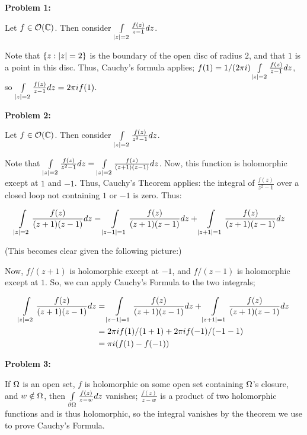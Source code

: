 \documentclass[a4paper,12pt]{article}
\begin{document}
{\bf Problem 1:}

Let $f \in \mathcal{O}(\mathbb{C})$. Then consider $\int\limits_{\left\lvert z \right\rvert = 2} \frac{f(z)}{z-1} dz$.

Note that $\{z: \left\lvert z \right\rvert=2\}$ is the boundary of the open disc of radius $2$, and that $1$ is a point in this disc. Thus, Cauchy's formula applies; $f(1) = 1/(2\pi i)  \int\limits_{\left\lvert z \right\rvert = 2} \frac{f(z)}{z-1} dz$, so $\int\limits_{\left\lvert z \right\rvert = 2} \frac{f(z)}{z-1} dz = 2 \pi i f(1)$.

\shunt

{\bf Problem 2:}

Let $f \in \mathcal{O}(\mathbb{C})$. Then consider $\int\limits_{\left\lvert z \right\rvert = 2} \frac{f(z)}{z^2-1} dz$.

Note that $\int\limits_{\left\lvert z \right\rvert = 2} \frac{f(z)}{z^2-1} dz = \int\limits_{\left\lvert z \right\rvert = 2} \frac{f(z)}{(z+1)(z-1)} dz$. Now, this function is holomorphic except at $1$ and $-1$. Thus, Cauchy's Theorem applies: the integral of $\frac{f(z)}{z^2-1}$ over a closed loop not containing $1$ or $-1$ is zero. Thus:

\begin{align*}
\int\limits_{\left\lvert z \right\rvert = 2} \frac{f(z)}{(z+1)(z-1)} dz &= \int\limits_{\left\lvert z-1 \right\rvert = 1} \frac{f(z)}{(z+1)(z-1)} dz + \int\limits_{\left\lvert z+1 \right\rvert = 1} \frac{f(z)}{(z+1)(z-1)} dz
\end{align*}

(This becomes clear given the following picture:)

\shunt

Now, $f/(z+1)$ is holomorphic except at $-1$, and $f/(z-1)$ is holomorphic except at $1$. So, we can apply Cauchy's Formula to the two integrals;

\begin{align*}
\int\limits_{\left\lvert z \right\rvert = 2} \frac{f(z)}{(z+1)(z-1)} dz &= \int\limits_{\left\lvert z-1 \right\rvert = 1} \frac{f(z)}{(z+1)(z-1)} dz + \int\limits_{\left\lvert z+1 \right\rvert = 1} \frac{f(z)}{(z+1)(z-1)} dz\\
&= 2\pi i f(1)/(1+1) + 2\pi i f(-1)/(-1-1)\\
&= \pi i (f(1)-f(-1))
\end{align*}

\shunt

{\bf Problem 3:}

If $\Omega$ is an open set, $f$ is holomorphic on some open set containing $\Omega$'s closure, and $w \notin \Omega$, then $ \int\limits_{\partial \Omega} \frac{f(z)}{z-w} dz$ vanishes; $\frac{f(z)}{z-w}$ is a product of two holomorphic functions and is thus holomorphic, so the integral vanishes by the theorem we use to prove Cauchy's Formula.
\end{document}
